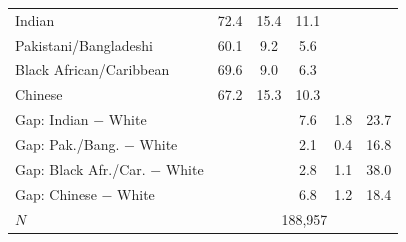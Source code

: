 \begin{table}[htbp]
\begin{tabular}{l ccccc}
Indian                        & 72.4       & 15.4       & 11.1       &            &            \\
Pakistani/Bangladeshi         & 60.1       & 9.2        & 5.6        &            &            \\
Black African/Caribbean       & 69.6       & 9.0        & 6.3        &            &            \\
Chinese                       & 67.2       & 15.3       & 10.3       &            &            \\
\addlinespace
Gap: Indian $-$ White         &            &            & 7.6        & 1.8        & 23.7       \\
Gap: Pak./Bang. $-$ White     &            &            & 2.1        & 0.4        & 16.8       \\
Gap: Black Afr./Car. $-$ White &            &            & 2.8        & 1.1        & 38.0       \\
Gap: Chinese $-$ White        &            &            & 6.8        & 1.2        & 18.4       \\
\addlinespace
$N$                           & \multicolumn{5}{c}{188,957} \\
\bottomrule
\end{tabular}
\end{table}

\clearpage

